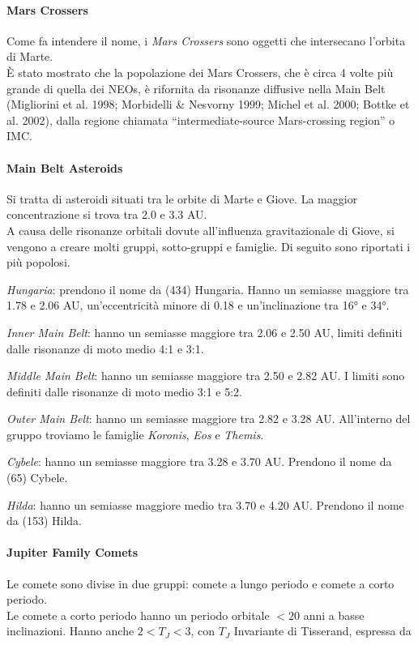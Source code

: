 \documentclass[a4paper,11pt,openright]{book}
\begin{document}
\paragraph*{Mars Crossers}
Come fa intendere il nome, i \textit{Mars Crossers} sono oggetti che intersecano l’orbita di Marte.\\
È stato mostrato che la popolazione dei Mars Crossers, che è circa 4 volte più grande di quella dei NEOs, è rifornita da risonanze diffusive nella Main Belt (Migliorini et al. 1998; Morbidelli \& Nesvorny 1999; Michel et al. 2000; Bottke et al. 2002), dalla regione chiamata “intermediate-source Mars-crossing region” o IMC.

\paragraph*{Main Belt Asteroids}
Si tratta di asteroidi situati tra le orbite di Marte e Giove. La maggior concentrazione si trova tra 2.0 e 3.3 AU.\\
A causa delle risonanze orbitali dovute all’influenza gravitazionale di Giove, si vengono a creare molti gruppi, sotto-gruppi e famiglie. Di seguito sono riportati i più popolosi.

\qquad \textit{Hungaria}: prendono il nome da (434) Hungaria. Hanno un semiasse maggiore tra 1.78 e 2.06 AU, un’eccentricità minore di 0.18 e un’inclinazione tra 16° e 34°. 

\qquad \textit{Inner Main Belt}: hanno un semiasse maggiore tra 2.06 e 2.50 AU, limiti definiti dalle risonanze di moto medio 4:1 e 3:1.

\qquad \textit{Middle Main Belt}: hanno un semiasse maggiore tra 2.50 e 2.82 AU. I limiti sono definiti dalle risonanze di moto medio 3:1 e 5:2.

\qquad \textit{Outer Main Belt}: hanno un semiasse maggiore tra 2.82 e 3.28 AU. All’interno del gruppo troviamo le famiglie \textit{Koronis}, \textit{Eos} e \textit{Themis}.

\qquad \textit{Cybele}: hanno un semiasse maggiore tra 3.28 e 3.70 AU. Prendono il nome da (65) Cybele.

\qquad \textit{Hilda}: hanno un semiasse maggiore medio tra 3.70 e 4.20 AU. Prendono il nome da (153) Hilda.

\paragraph*{Jupiter Family Comets}
Le comete sono divise in due gruppi: comete a lungo periodo e comete a corto periodo.\\
Le comete a corto periodo hanno un periodo orbitale $< 20$ anni a basse inclinazioni. Hanno anche $2<T_J<3$, con $T_J$ Invariante di Tisserand, espressa da
\end{document}
